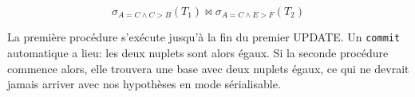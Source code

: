 \begin{solution}
$$\sigma_{A=C \land C > B} (T_1) \Join \sigma_{A=C \land E > F}(T_2)$$
\end{solution}

\begin{solution}
La première procédure s'exécute jusqu'à la fin du premier UPDATE. Un \texttt{commit} automatique
a lieu: les deux nuplets sont alors égaux. Si la seconde procédure commence alors, elle trouvera
une base avec deux nuplets égaux, ce qui ne devrait jamais arriver avec nos hypothèses en mode sérialisable.
\end{solution}


